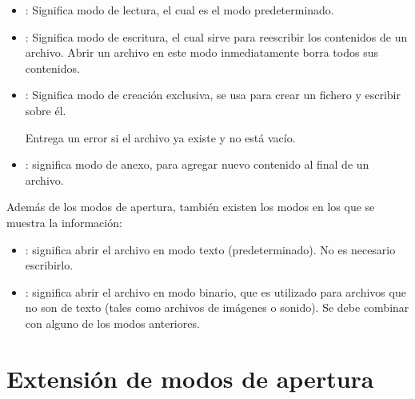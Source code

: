 \begin{itemize}
  \item {}: Significa modo de lectura, el cual es el modo predeterminado.
  

  \item {}: Significa modo de escritura, el cual sirve para reescribir los contenidos de un archivo.
  Abrir un archivo en este modo inmediatamente borra todos sus contenidos.
  

  \item {}: Significa modo de creación exclusiva, se usa para crear un fichero y escribir sobre él.
  

  Entrega un error  si el archivo ya existe y no está vacío.


  \item {}: significa modo de anexo, para agregar nuevo contenido al final de un archivo.


\end{itemize}

Además de los modos de apertura, también existen los modos en los que se muestra la información:

\begin{itemize}
  \item {}: significa abrir el archivo en modo texto (predeterminado).
  No es necesario escribirlo.
  
  \item {}: significa abrir el archivo en modo binario, que es utilizado para archivos que no son de texto (tales como archivos de imágenes o sonido).
  Se debe combinar con alguno de los modos anteriores.


\end{itemize}

\section{Extensión de modos de apertura}


